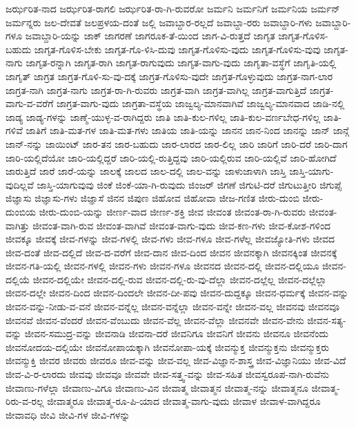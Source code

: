 {ಜರ್ಝರಿತ-ನಾದ
ಜರ್ಝರಿತ-ರಾಗಲಿ
ಜರ್ಝರಿತ-ರಾ-ಗಿ-ರುವರೋ
ಜರ್ಮನಿ
ಜರ್ಮನಿಗೆ
ಜರ್ಮನಿಯ
ಜರ್ಮನ್
ಜರ್ಮನ್ನರು
ಜಲ-ದೇವತೆ
ಜಲಪ್ರಳಯ-ದಂತೆ
ಜಲ್ಲಿ
ಜವಾಬ್ದಾರ-ರಲ್ಲದೆ
ಜವಾಬ್ದಾ-ರರು
ಜವಾಬ್ದಾರಿ-ಗಳು
ಜವಾಬ್ದಾರಿ-ಗಳೂ
ಜವಾಬ್ದಾರಿ-ಯನ್ನು
ಜಾಕ್
ಜಾಗರಣೆ
ಜಾಗರೂಕ-ತೆ-ಯಿಂದ
ಜಾಗ-ವಿ-ರುತ್ತದೆ
ಜಾಗೃತ
ಜಾಗೃತ-ಗೊಳಿಸ-ಬಹುದು
ಜಾಗೃತ-ಗೊಳಿಸ-ಬೇಕು
ಜಾಗೃತ-ಗೊ-ಳಿಸಿ-ದುವು
ಜಾಗೃತ-ಗೊಳಿಸು-ವುದು
ಜಾಗೃತ-ಗೊಳಿಸು-ವುವು
ಜಾಗೃತ-ನಾಗು
ಜಾಗೃತ-ರನ್ನಾಗಿ
ಜಾಗೃತ-ರಾಗಿ
ಜಾಗೃತ-ರಾಗುವುದು
ಜಾಗೃತ-ವಾಗು-ವುದು
ಜಾಗೃತಾ-ವಸ್ಥೆಗೆ
ಜಾಗೃತಿ-ಯಲ್ಲಿ
ಜಾಗೃತ್
ಜಾಗ್ರತ
ಜಾಗ್ರತ-ಗೊಳಿ-ಸು-ವು-ದಕ್ಕೆ
ಜಾಗ್ರತ-ಗೊಳಿಸು-ವುದೇ
ಜಾಗ್ರತ-ಗೊಳ್ಳುವುದು
ಜಾಗ್ರತ-ನಾಗ-ಲಾರ
ಜಾಗ್ರತ-ನಾಗಿ
ಜಾಗ್ರತ-ನಾಗು
ಜಾಗ್ರತ-ರಾ-ಗಿ-ರುವರು
ಜಾಗ್ರತ-ವಾಗಿ
ಜಾಗ್ರತ-ವಾಗಿಲ್ಲ
ಜಾಗ್ರತ-ವಾಗುತ್ತಿದೆ
ಜಾಗ್ರತ-ವಾಗು-ವ-ವರೆಗೆ
ಜಾಗ್ರತ-ವಾಗು-ವುದು
ಜಾಗ್ರತಾ-ವಸ್ಥೆಯ
ಜಾಜ್ವಲ್ಯ-ಮಾನವಾಗಿವೆ
ಜಾಜ್ವಲ್ಯ-ಮಾನವಾದ
ಜಾಡಿ-ನಲ್ಲಿ
ಜಾಡ್ಯ
ಜಾಡ್ಯ-ಗಳನ್ನು
ಜಾಣ್ಮೆ-ಯುಳ್ಳ-ವ-ರಾಗಿದ್ದರು
ಜಾತಿ
ಜಾತಿ-ಕುಲ-ಗಳಿಲ್ಲ
ಜಾತಿ-ಕುಲ-ವರ್ಣಬೇಧ-ಗಳಿಲ್ಲ
ಜಾತಿ-ಗಳಿವೆ
ಜಾತಿಗೆ
ಜಾತಿ-ಮತ-ಗಳ
ಜಾತಿ-ಮತ-ಗಳು
ಜಾತಿಯ
ಜಾತಿ-ಯನ್ನು
ಜಾನನ
ಜಾನ-ನಿಂದ
ಜಾನನ್ನು
ಜಾನ್
ಜಾನ್ಗೆ
ಜಾನ್-ನನ್ನು
ಜಾಯಿಂಟ್
ಜಾರ-ತನ
ಜಾರ-ಬಹುದು
ಜಾರ-ಲಾರದ
ಜಾರ-ಲಿಲ್ಲ
ಜಾರಿ
ಜಾರಿಗೆ
ಜಾರಿ-ದರೆ
ಜಾರಿ-ದಾಗ
ಜಾರಿ-ಯಲ್ಲಿದೆಯೋ
ಜಾರಿ-ಯಲ್ಲಿದ್ದರೆ
ಜಾರಿ-ಯಲ್ಲಿ-ರುತ್ತಿದ್ದವು
ಜಾರಿ-ಯಲ್ಲಿರುವ
ಜಾರಿ-ಯಲ್ಲಿವೆ
ಜಾರಿ-ಹೋಗಿದೆ
ಜಾರುತ್ತಿದೆ
ಜಾರೆ
ಜಾರೆ-ಯನ್ನು
ಜಾಲಕ್ಕೆ
ಜಾಲದ
ಜಾಲ-ದಲ್ಲಿ
ಜಾಲ-ವನ್ನು
ಜಾಳುಜಾಳಾಗಿ
ಜಾಸ್ತಿ
ಜಾಸ್ತಿ-ಯಾಗು-ವುದಿಲ್ಲವೆ
ಜಾಸ್ತಿ-ಯಾಗುವುವು
ಜಿಂಕೆ
ಜಿಂಕೆ-ಯಾ-ಗಿ-ರುವುದು
ಜಿಂಜರ್
ಜಿಗಣೆ
ಜಿಗುಟಿ-ದರೆ
ಜಿಗುಟುತ್ತೀರಿ
ಜಿಗುಪ್ಸೆ
ಜಿಜ್ಞಾಸು
ಜಿಜ್ಞಾಸು-ಗಳು
ಜಿಜ್ಞಾಸೆ
ಜಿನನ
ಜಿಪುಣ
ಜಿಹೋವ
ಜಿಹೋವಾ
ಜೀಜ-ಗಣಿತ
ಜೀರು-ದುಂಬಿ
ಜೀರು-ದುಂಬಿಯ
ಜೀರು-ದುಂಬಿ-ಯನ್ನು
ಜೀರ್ಣ-ವಾದ
ಜೀರ್ಣ-ಶಕ್ತಿ
ಜೀವ
ಜೀವಂತ
ಜೀವಂತ-ರಾ-ಗಿ-ರುವರು
ಜೀವಂತ-ವಾಗಿತ್ತು
ಜೀವಂತ-ವಾಗಿ-ರುವ
ಜೀವಂತ-ವಾಗಿವೆ
ಜೀವಂತ-ವಾಗು-ವುದು
ಜೀವ-ಕಣ-ಗಳು
ಜೀವ-ಕೋಶ-ಗಳಿಂದ
ಜೀವಕ್ಕೂ
ಜೀವಕ್ಕೆ
ಜೀವ-ಗಳನ್ನು
ಜೀವ-ಗಳಲ್ಲಿ
ಜೀವ-ಗಳು
ಜೀವ-ಗಳೂ
ಜೀವ-ಗಳೆಲ್ಲ
ಜೀವಜ್ಯೋತಿ-ಗಳು
ಜೀವದ
ಜೀವ-ದಂತೆ
ಜೀವ-ದಲ್ಲಿದೆ
ಜೀವ-ದ-ವರೆಗೆ
ಜೀವ-ದಾನ
ಜೀವ-ದಿಂದ
ಜೀವನ
ಜೀವನಕ್ಕಾಗಿ
ಜೀವನಕ್ಕಿಂತ
ಜೀವನಕ್ಕೆ
ಜೀವನ-ಗತಿ-ಯಲ್ಲಿ
ಜೀವನ-ಗಳಲ್ಲಿ
ಜೀವನ-ಗಳು
ಜೀವನ-ಗಳೂ
ಜೀವನದ
ಜೀವನ-ದಲ್ಲಿ
ಜೀವನ-ದಲ್ಲಿಯೂ
ಜೀವನ-ದಲ್ಲಿಯೆ
ಜೀವನ-ದಲ್ಲಿಯೇ
ಜೀವನ-ದಲ್ಲಿ-ರುವ
ಜೀವನ-ದಲ್ಲಿ-ರು-ವು-ದೆಲ್ಲಾ
ಜೀವನ-ದಲ್ಲೆಲ್ಲ
ಜೀವನ-ದಲ್ಲೆಲ್ಲಾ
ಜೀವನ-ದಲ್ಲೇ
ಜೀವನ-ದಿಂದ
ಜೀವನ-ದಿಂದಲೇ
ಜೀವನ-ದೀ-ಪವು
ಜೀವನ-ದುದ್ದಕ್ಕೂ
ಜೀವನ-ಧರ್ಮಕ್ಕೆ
ಜೀವನ-ವನ್ನು
ಜೀವನ-ವನ್ನು-ನೀಡು-ವ-ವನೆ
ಜೀವನ-ವನ್ನೆಲ್ಲ
ಜೀವನ-ವನ್ನೆಲ್ಲಾ
ಜೀವನ-ವನ್ನೇ
ಜೀವನ-ವಲ್ಲ
ಜೀವನವು
ಜೀವನವೂ
ಜೀವನವೆ
ಜೀವನ-ವೆಂದರೆ
ಜೀವನ-ವೆಂಬುದು
ಜೀವನ-ವೆಲ್ಲ
ಜೀವನ-ವೆಲ್ಲಾ
ಜೀವನವೇ
ಜೀವನ-ವೇನು
ಜೀವನ-ಸತ್ಯ-ವನ್ನು
ಜೀವನ-ಸಮುದ್ರ-ವನ್ನು
ಜೀವನಾಡಿ
ಜೀವನಾ-ದರೆ
ಜೀವನಿಗೂ
ಜೀವನಿಗೆ
ಜೀವನು
ಜೀವನೂ
ಜೀವನೆಂದು
ಜೀವನೋದಯ-ದಲ್ಲಿಯೇ
ಜೀವನೋಪಾಯಕ್ಕಾಗಿ
ಜೀವನೋಪಾ-ಯಕ್ಕೆ
ಜೀವನ್ಮುಕ್ತ
ಜೀವನ್ಮುಕ್ತನು
ಜೀವನ್ಮುಕ್ತರು
ಜೀವನ್ಮುಕ್ತಿ
ಜೀವರ
ಜೀವರು
ಜೀವರೂ
ಜೀವ-ವನ್ನು
ಜೀವ-ವಲ್ಲ
ಜೀವ-ವಿಜ್ಞಾನ-ಶಾಸ್ತ್ರ
ಜೀವ-ವಿಜ್ಞಾನಿಯು
ಜೀವ-ವಿದೆ
ಜೀವ-ವಿ-ರ-ಲಾರದು
ಜೀವವು
ಜೀವವೂ
ಜೀವವೇ
ಜೀವ-ಸತ್ತ್ವ-ವನ್ನು
ಜೀವ-ಸಹಿತ
ಜೀವಸ್ವರೂಪ-ನಾಗಿ-ರುವೆನು
ಜೀವಾಣು-ಗಳೆಲ್ಲಾ
ಜೀವಾಣು-ವಿಗೂ
ಜೀವಾಣು-ವಿನ
ಜೀವಾತ್ಮ
ಜೀವಾತ್ಮನ
ಜೀವಾತ್ಮ-ನನ್ನು
ಜೀವಾತ್ಮನೂ
ಜೀವಾತ್ಮ-ರಿರು-ವ-ರಲ್ಲ
ಜೀವಾತ್ಮರೂ
ಜೀವಾತ್ಮ-ರೂ-ಪಿ-ಯಾದ
ಜೀವಾತ್ಮ-ವಾಗು-ವುದು
ಜೀವಾಳ
ಜೀವಾಳ-ವಾಗಿದ್ದರೂ
ಜೀವಾವಧಿ
ಜೀವಿ
ಜೀವಿ-ಗಳ
ಜೀವಿ-ಗಳನ್ನು
}

